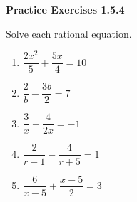\vspace{1ex}
\noindent\textbf{Practice Exercises 1.5.4}

\vspace{0.75ex}

Solve each rational equation. 
\begin{multicols}{2}
\begin{enumerate}[label = \color{blue}\arabic*. ]
\item $ \dfrac{2x^{2}}{5} + \dfrac{5x}{4} = 10 $
\item $ \dfrac{2}{b} - \dfrac{3b}{2} = 7 $
\item $ \dfrac{3}{x} - \dfrac{4}{2x} = -1 $
\item $ \dfrac{2}{r-1} - \dfrac{4}{r+5} = 1 $
\item $ \dfrac{6}{x-5} + \dfrac{x-5}{2} = 3 $
\end{enumerate}
\end{multicols} 
